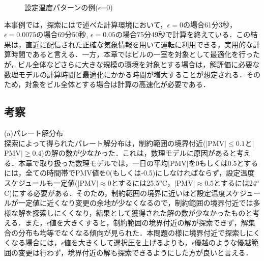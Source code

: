 \begin{figure}[htbp]
\begin{center}
\begin{minipage}{0.4\textwidth}
\begin{center}
      \end{center}
    \end{minipage}
  \end{center}
  \caption{設定温度パターンの例($\epsilon$=0)}
  \label{fig::math_result_schedule_settemp10}
\end{figure}

本事例では，探索にはで述べた計算環境において，$\epsilon=0$の場合61分3秒，$\epsilon=0.0075$の場合69分50秒, $\epsilon=0.05$の場合75分49秒で計算を終えている．この結果は，直近に配信された正確な気象情報を用いて運転に利用できる，実用的な計算時間であると言える．一方，本章ではビルの一室を対象として最適化を行ったが，ビル全体などさらに大きな規模の環境を対象とする場合は，解評価に必要な数理モデルの計算時間と最適化にかかる時間が増大することが想定される．そのため，対象をビル全体とする場合は計算の高速化が必要である．

\subsection{考察}

(a)パレート解分布\\
探索によって得られたパレート解分布は，制約範囲の境界付近($|$PMV$|\leq 0.1$と$|$PMV$|\geq 0.4$)の解の数が少なかった．これは，数理モデルに原因があると考える．本章で取り扱った数理モデルでは，一日の平均$|$PMV$|$を0もしくは0.5とするには，全ての時間帯でPMV値を0(もしくは-0.5)にしなければならず，設定温度スケジュールも一定値($|$PMV$|\approx0$とするには25.5$^o$C，$|$PMV$|\approx0.5$とするには24$^o$C)にする必要がある．そのため，制約範囲の境界に近いほど設定温度スケジュールが一定値に近くなり変更の余地が少なくなるので，制約範囲の境界付近では多様な解を探索しにくくなり，結果として獲得された解の数が少なかったものと考える．また，$\epsilon$値を大きくすると，制約範囲の境界付近の解が探索できず，解集合の分布も均等でなくなる傾向が見られた．本問題の様に境界付近で探索しにくくなる場合には，$\epsilon$値を大きくして選択圧を上げるよりも，$\epsilon$優越のような優越範囲の変更は行わず，境界付近の解も探索できるようにした方が良いと言える．

